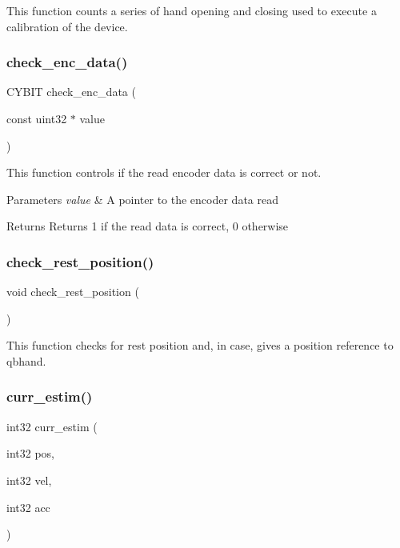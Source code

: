 This function counts a series of hand opening and closing used to execute a calibration of the device. \mbox{\label{utils_8c_ae7faec5b3a1d000c90f70abfc1dfca92}} 
\subsubsection{check\+\_\+enc\+\_\+data()}
{\footnotesize\ttfamily C\+Y\+B\+IT check\+\_\+enc\+\_\+data (\begin{DoxyParamCaption}\item[{const uint32 $\ast$}]{value }\end{DoxyParamCaption})}

This function controls if the read encoder data is correct or not.


\begin{DoxyParams}{Parameters}
{\em value} & A pointer to the encoder data read\\
\hline
\end{DoxyParams}
\begin{DoxyReturn}{Returns}
Returns 1 if the read data is correct, 0 otherwise 
\end{DoxyReturn}
\mbox{\label{utils_8c_a13fca172b37b6f76749a864c1439b497}} 
\subsubsection{check\+\_\+rest\+\_\+position()}
{\footnotesize\ttfamily void check\+\_\+rest\+\_\+position (\begin{DoxyParamCaption}{ }\end{DoxyParamCaption})}

This function checks for rest position and, in case, gives a position reference to qbhand. \mbox{\label{utils_8c_a9ba0c640911e8eaac858c23b43b06ad7}} 
\subsubsection{curr\+\_\+estim()}
{\footnotesize\ttfamily int32 curr\+\_\+estim (\begin{DoxyParamCaption}\item[{int32}]{pos,  }\item[{int32}]{vel,  }\item[{int32}]{acc }\end{DoxyParamCaption})}

